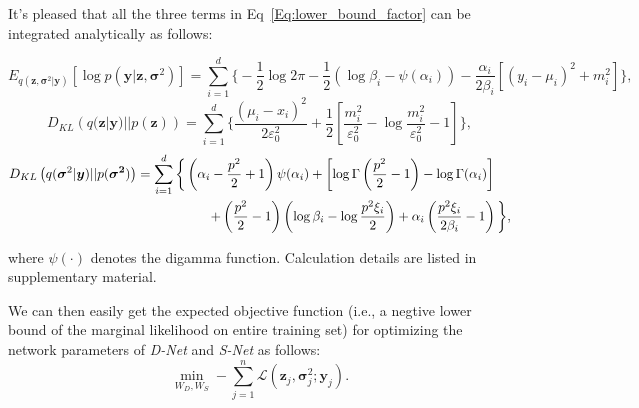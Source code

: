 \documentclass{article}
\begin{document}
It's pleased that all the three terms in Eq~\eqref{Eq:lower_bound_factor} can be integrated
analytically as follows:
\begin{footnotesize}
\begin{equation}
    E_{q(\bm{z},\bm{\sigma}^2|\bm{y})}\left[ \log p(\bm{y}|\bm{z},\bm{\sigma}^2) \right]
    = \sum_{i=1}^d \Big\{-\frac{1}{2}\log 2\pi - \frac{1}{2}(\log \beta_i - \psi(\alpha_i))
    -\frac{\alpha_i}{2\beta_i}\left[ (y_i-\mu_i)^2 + m_i^2\right]\Big\},
    \label{Eq:lower_bound_likeli}
\end{equation}
\begin{equation}
    D_{KL}\left(q(\bm{z}|\bm{y}) || p(\bm{z}) \right) = \sum_{i=1}^d \Big\{
        \frac{(\mu_i-x_i)^2}{2\varepsilon_0^2}
        + \frac{1}{2}\left[\frac{m_i^2}{\varepsilon_0^2}-\log \frac{m_i^2}{\varepsilon_0^2} -1 \right]
    \Big\},
    \label{Eq:lower_bound_group_kl1} 
\end{equation}
\begin{align}
    D_{KL} \left(q(\bm{\sigma}^2|\bm{y}) || p(\bm{\sigma^2}) \right) &= \sum_{i=1}^d \bigg\{
        \left(\alpha_i-\frac{p^2}{2}+1\right)\psi(\alpha_i)
        + \left[ \log \Gamma \left(\frac{p^2}{2}-1\right) - \log \Gamma (\alpha_i)\right] \notag \\
        &\mathrel{\phantom{=}} \hspace{1.5cm}+\left(\frac{p^2}{2}-1\right)\left(\log \beta_i - \log \frac{p^2\xi_i}{2}\right)
        +\alpha_i \left(\frac{p^2\xi_i}{2\beta_i}-1\right)\bigg\},
        \label{Eq:lower_bound_group_kl2}
\end{align}
\end{footnotesize}
where $\psi(\cdot)$ denotes the digamma function. Calculation details are listed in supplementary material.

We can then easily get the expected objective function (i.e., a negtive lower bound of the marginal likelihood on
entire training set) for optimizing the network parameters of \textit{D-Net} and \textit{S-Net} as follows:
\begin{equation}
\min_{W_D,W_S} -\sum_{j=1}^n \mathcal{L}(\bm{z}_j,\bm{\sigma}_j^2;\bm{y}_j). \label{Eq:Objective}
\end{equation}
\end{document}
